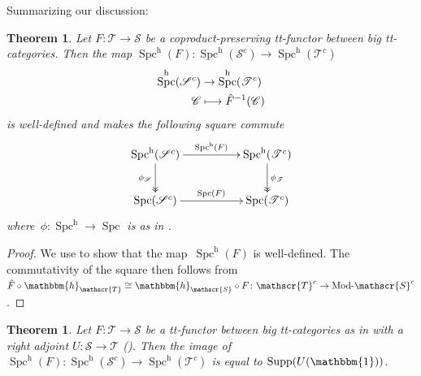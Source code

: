\documentclass[JEP,XML,SOM,Unicode]{cedram}
\def\mto{\mathchoice{\longmapsto}{\mapsto}{\mapsto}{\mapsto}}
\numberwithin{equation}{section}
\newtheorem{Thm}[equation]{Theorem}
\theoremstyle{definition}
\DeclareMathOperator{\Spc}{Spc}
\newcommand{\cat}[1]{\mathscr{#1}}
\newcommand{\inv}{^{-1}}
\newcommand{\unit}{\mathbbm{1}}
\DeclareMathOperator{\Mod}{Mod}
\newcommand{\smallh}{\mathrm{h}}
\DeclareMathOperator{\Supp}{Supp}
\newcommand{\cC}{\cat{C}}
\newcommand{\cS}{\cat{S}}
\newcommand{\cT}{\cat{T}}
\newcommand{\Modd}{\Mod\text{\!-}}
\newcommand{\MS}{\Modd\cat S^c}
\newcommand{\SpchS}{\Spch(\cat{S}^c)}
\newcommand{\SpchT}{\Spch(\cat{T}^c)}
\newcommand{\Spch}{\Spc^{\smallh}}
\newcommand{\SpcS}{\Spc(\cat{S}^c)}
\newcommand{\SpcT}{\Spc(\cat{T}^c)}
\newcommand{\yoneda}{\mathbbm{h}}
\begin{document}
Summarizing our discussion:
\begin{Thm}
\label{Thm:Spc(F)}
Let $F\colon \cT\to \cS$ be a coproduct-preserving tt-functor between big tt-categories. Then the map $\Spch(F)\colon\SpchS \to \SpchT$
\begin{align*}
\SpchS & \to \SpchT
\\
\cC & \mto \hat F\inv(\cC)
\end{align*}
is well-defined and makes the following square commute
\begin{equation}
\label{eq:Spc(F)}
\vcenter{\xymatrix@C=5em{
\SpchS \ar[r]^-{\Spch(F)} \ar@{->>}[d]_-{\phi_{\cS}}
& \SpchT \ar@{->>}[d]^-{\phi_{\cT}}
\\
\SpcS \ar[r]^-{\Spc(F)}
& \SpcT
}}
\end{equation}
where~$\phi\colon \Spch\to \Spc$ is as in .
\end{Thm}

\begin{proof}
We use  to show that the map~$\Spch(F)$ is well-defined. The commutativity of the square then follows from $\hat F \circ \yoneda_{\cT}\cong\yoneda_{\cS}\circ F\colon \cT^c\to \MS$.
\end{proof}

\begin{Thm}
\label{Thm:Spc-image}
Let $F\colon \cT\to \cS$ be a tt-functor between big tt-categories as in  with a right adjoint $U\colon \cS\to \cT$ (). Then the image of $\Spch(F)\colon \SpchS\to \SpchT$ is equal to
$\Supp(U(\unit))$.
\end{Thm}
\end{document}
